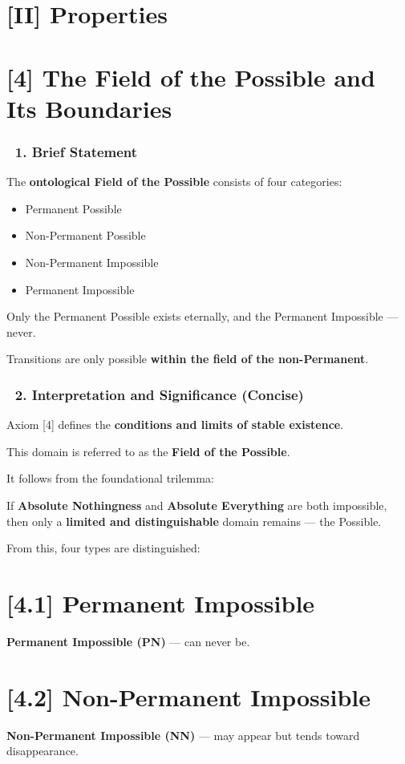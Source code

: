 \documentclass[12pt]{article}
\begin{document}
\section*{[II] Properties}

\section*{[4] The Field of the Possible and Its Boundaries}

\subsubsection*{🔹 1. Brief Statement}
The \textbf{ontological Field of the Possible} consists of four categories:
\begin{itemize}
\item Permanent Possible
\item Non-Permanent Possible
\item Non-Permanent Impossible
\item Permanent Impossible
\end{itemize}

Only the Permanent Possible exists eternally, and the Permanent Impossible — never.

Transitions are only possible \textbf{within the field of the non-Permanent}.

\subsubsection*{🔹 2. Interpretation and Significance (Concise)}
Axiom [4] defines the \textbf{conditions and limits of stable existence}.

This domain is referred to as the \textbf{Field of the Possible}.

It follows from the foundational trilemma:

If \textbf{Absolute Nothingness} and \textbf{Absolute Everything} are both impossible, then only a \textbf{limited and distinguishable} domain remains — the Possible.

From this, four types are distinguished:

\section*{[4.1] Permanent Impossible}
\textbf{Permanent Impossible (PN)} — can never be.

\section*{[4.2] Non-Permanent Impossible}
\textbf{Non-Permanent Impossible (NN)} — may appear but tends toward disappearance.
\end{document}
